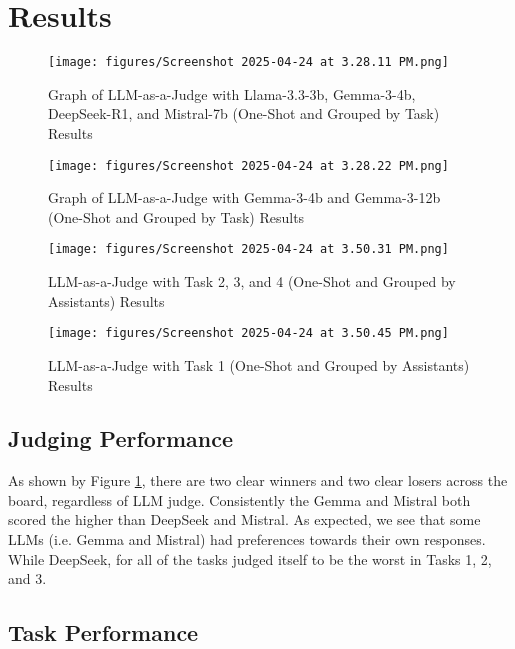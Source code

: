 \documentclass{brandeis-thesis3.2}
\theoremstyle{plain}
\theoremstyle{definition}
\theoremstyle{remark}
\numberwithin{equation}{section}
\begin{document}
\section{Results}
\begin{figure}[h!]
    \centering
    \texttt{[image: figures/Screenshot 2025-04-24 at 3.28.11 PM.png]}
    \caption{Graph of LLM-as-a-Judge with Llama-3.3-3b, Gemma-3-4b, DeepSeek-R1, and Mistral-7b (One-Shot and Grouped by Task) Results}
    \label{fig:llm_judge_all}
\end{figure}
\begin{figure}[h!]
    \centering
    \texttt{[image: figures/Screenshot 2025-04-24 at 3.28.22 PM.png]}
    \caption{Graph of LLM-as-a-Judge with Gemma-3-4b and Gemma-3-12b (One-Shot and Grouped by Task) Results}
    \label{fig:llm_judge_gemmas}
\end{figure}
\begin{figure}[h!]
    \centering
    \texttt{[image: figures/Screenshot 2025-04-24 at 3.50.31 PM.png]}
    \caption{LLM-as-a-Judge with Task 2, 3, and 4 (One-Shot and Grouped by Assistants) Results}
    \label{fig:llm_judge_t234}
\end{figure}
\begin{figure}[h!]
    \centering
    \texttt{[image: figures/Screenshot 2025-04-24 at 3.50.45 PM.png]}
    \caption{LLM-as-a-Judge with Task 1 (One-Shot and Grouped by Assistants) Results}
    \label{fig:llm_judge_t1}
\end{figure}

\subsection{Judging Performance}

As shown by Figure \ref{fig:llm_judge_all}, there are two clear winners and two clear losers across the board, regardless of LLM judge. Consistently the Gemma and Mistral both scored the higher than DeepSeek and Mistral. As expected, we see that some LLMs (i.e. Gemma and Mistral) had preferences towards their own responses. While DeepSeek, for all of the tasks judged itself to be the worst in Tasks 1, 2, and 3.



\subsection{Task Performance}
\end{document}
